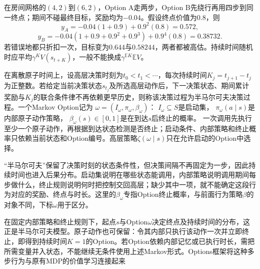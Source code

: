 \begin{example}[持续时间不能忽略]
  \label{ex:rl-learning-option-duration}
  在房间网格的$(4,2)$到$(6,2)$，Option A走两步，Option B先绕行再用四步到同一终点；期间不碰最终目标，奖励均为$-0.04$。假设终点价值为$0.8$，则
  \[
    y_A=-0.04(1+0.9)+0.9^2(0.8)=0.572,
  \]
  \[
    y_B=-0.04(1+0.9+0.9^2+0.9^3)+0.9^4(0.8)=0.38732.
  \]
  若错误地都只折扣一次，目标变为$0.644$与$0.58244$，两者都被高估。持续时间随机时应平均$\gamma^K V(s_{t+K})$，一般不能换成$\gamma^{\mathbb E K}\mathbb E V$。
\end{example}

\begin{definition}
  \label{def:rl-learning-option}
  在离散原子时间上，设高层决策时刻为$t_0<t_1<\cdots$，每次持续时间$K_j=t_{j+1}-t_j$为正整数。若给定当前决策状态$s_{t_j}$及所选高层动作后，下一决策状态、期间累计奖励与$K_j$的联合条件律不再依赖更早历史，则称该决策过程为半马尔可夫决策过程。一个Markov Option记为
  $\omega=(I_\omega,\pi_\omega,\beta_\omega)$：
  $I_\omega\subseteq S$是启动集，
  $\pi_\omega(a\mid s)$是内部原子动作策略，
  $\beta_\omega(s)\in[0,1]$是在到达$s$后终止的概率。
  一次调用先执行至少一个原子动作，再根据到达状态检测是否终止；启动条件、内部策略和终止概率只依赖当前状态和Option编号。高层策略$\zeta(\omega\mid s)$只在允许启动的Option中选择。
\end{definition}

“半马尔可夫”保留了决策时刻的状态条件性，但决策间隔不再固定为一步，因此持续时间也进入后果分布。启动集说明在哪些状态能调用，内部策略说明调用期间每步做什么，终止规则说明何时把控制交回高层；缺少其中一项，就不能确定这段行为对应的奖励、终点与时长。这里的$\beta_\omega$专指Option终止概率，与前面行为策略$\beta$的对象不同，下标$\omega$用于区分。

在固定内部策略和终止规则下，起点$s$与Option$\omega$决定终点及持续时间的分布，这正是半马尔可夫模型。原子动作也可保留：令其内部只执行该动作一次并立即终止，即得到持续时间$K=1$的Option。若Option依赖内部记忆或已执行时长，需把所需变量并入状态，不能继续无条件使用上述Markov形式。Options框架将这种多步行为与原有MDP的价值学习连接起来

